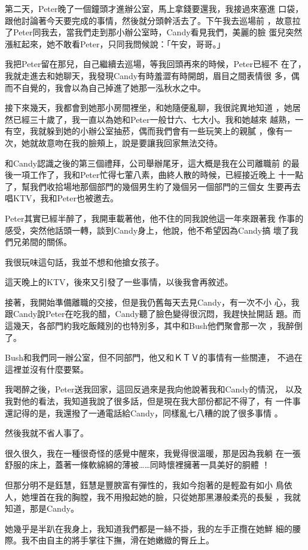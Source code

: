 第二天，Peter晚了一個鐘頭才進辦公室，馬上拿錢要還我，我接過來塞進
口袋，跟他討論著今天要完成的事情，然後就分頭幹活去了。下午我去巡場前
，故意拉了Peter同我去，當我們走到那小辦公室時，Candy看見我們，美麗的臉
蛋兒突然漲紅起來，她不敢看Peter，只同我問候說：「午安，哥哥。」

我把Peter留在那兒，自己繼續去巡場，等我回頭再來的時候，Peter已經不
在了，我就走進去和她聊天，我發現Candy有時羞澀有時開朗，眉目之間表情很
多，偶而不自覺的，我會以為自己掉進了她那一泓秋水之中。

接下來幾天，我都會到她那小房間裡坐，和她隨便亂聊，我很詫異地知道
，她居然已經三十歲了，我一直以為她和Peter一般廿六、七大小。我和她越來
越熟，一有空，我就躲到她的小辦公室抽菸，偶而我們會有一些玩笑上的親膩
，像有一次，她就故意吻在我的臉頰上，說是要讓我回家無法交待。

和Candy認識之後的第三個禮拜，公司舉辦尾牙，這大概是我在公司離職前
的最後一項工作了，我和Peter忙得七葷八素，曲終人散的時候，已經接近晚上
十一點了，幫我們收拾場地那個部門的幾個男生約了幾個另一個部門的三個女
生要再去唱KTV，我和Peter也被邀去。

Peter其實已經半醉了，我開車載著他，他不住的同我說他這一年來跟著我
作事的感受，突然他話頭一轉，談到Candy身上，他說，他不希望因為Candy搞
壞了我們兄弟間的關係。

我很玩味這句話，我並不想和他搶女孩子。

這天晚上的KTV，後來又引發了一些事情，以後我會再敘述。

接著，我開始準備離職的交接，但是我仍舊每天去見Candy，有一次不小
心，我跟Candy說Peter在吃我的醋，Candy聽了臉色變得很沉悶，我趕快扯開話
題。而這幾天，各部門約我吃飯餞別的也特別多，其中和Bush他們聚會那一次
，我醉倒了。

Bush和我們同一辦公室，但不同部門，他又和ＫＴＶ的事情有一些關連，
不過在這裡並沒有什麼要緊。

我喝醉之後，Peter送我回家，這回反過來是我向他說著我和Candy的情況，
以及我對他的看法，我知道我說了很多話，但是現在我大部份都記不得了，有
一件事還記得的是，我還撥了一通電話給Candy，同樣亂七八糟的說了很多事情
。

然後我就不省人事了。

很久很久，我在一種很奇怪的感覺中醒來，我覺得很溫暖，那是因為我躺
在一張舒服的床上，蓋著一條軟綿綿的薄被……同時懷裡擁著一具美好的胴體
！

但那分明不是鈺慧，鈺慧是豐腴富有彈性的，我如今抱著的是輕盈有如小
鳥依人，她埋首在我的胸膛，我不用撥起她的臉，只從她那黑瀑般柔亮的長髮
，我就知道，那是Candy。

她幾乎是半趴在我身上，我知道我們都是一絲不掛，我的左手正攬在她鮮
細的腰際。我不由自主的將手掌往下撫，滑在她嫩緻的臀丘上。

